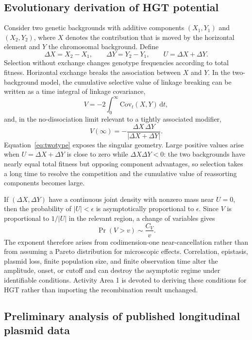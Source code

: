 \documentclass[12pt,a4paper]{article}
\newcommand{\Prob}{\Pr}
\newcommand{\Cov}{\mathrm{Cov}}
\newcommand{\dd}{\,\mathrm{d}}
\begin{document}
\subsection{Evolutionary derivation of HGT potential}

Consider two genetic backgrounds with additive components $(X_1,Y_1)$ and $(X_2,Y_2)$, where $X$ denotes the contribution that is moved by the horizontal element and $Y$ the chromosomal background. Define
\[
\Delta X=X_2-X_1,\qquad \Delta Y=Y_2-Y_1,\qquad U=\Delta X+\Delta Y.
\]
Selection without exchange changes genotype frequencies according to total fitness. Horizontal exchange breaks the association between $X$ and $Y$. In the two-background model, the cumulative selective value of linkage breaking can be written as a time integral of linkage covariance,
\begin{equation}
V=-2\int_0^{\infty}\Cov_t(X,Y)\dd t,
\label{eq:covint}
\end{equation}
and, in the no-dissociation limit relevant to a tightly associated modifier,
\begin{equation}
V(\infty)=-\frac{\Delta X\,\Delta Y}{|\Delta X+\Delta Y|}.
\label{eq:twotype}
\end{equation}
Equation~\eqref{eq:twotype} exposes the singular geometry. Large positive values arise when $U=\Delta X+\Delta Y$ is close to zero while $\Delta X\Delta Y<0$: the two backgrounds have nearly equal total fitness but opposing component advantages, so selection takes a long time to resolve the competition and the cumulative value of reassorting components becomes large.

If $(\Delta X,\Delta Y)$ have a continuous joint density with nonzero mass near $U=0$, then the probability of $|U|<\epsilon$ is asymptotically proportional to $\epsilon$. Since $V$ is proportional to $1/|U|$ in the relevant region, a change of variables gives
\begin{equation}
\Prob(V>v)\sim \frac{C_V}{v}.
\end{equation}
The exponent therefore arises from codimension-one near-cancellation rather than from assuming a Pareto distribution for microscopic effects. Correlation, epistasis, plasmid loss, finite population size, and finite observation time alter the amplitude, onset, or cutoff and can destroy the asymptotic regime under identifiable conditions. Activity Area 1 is devoted to deriving these conditions for HGT rather than importing the recombination result unchanged.


\subsection{Preliminary analysis of published longitudinal plasmid data}
\label{sec:prelim_loftie}
\end{document}

